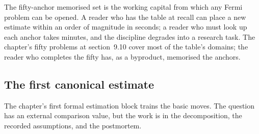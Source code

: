 The fifty-anchor memorised set is the working capital from which
any Fermi problem can be opened. A reader who has the table at
recall can place a new estimate within an order of magnitude in
seconds; a reader who must look up each anchor takes minutes, and
the discipline degrades into a research task. The chapter's fifty
problems at section~9.10 cover most of the table's domains; the
reader who completes the fifty has, as a byproduct, memorised the
anchors.

\subsection{The first canonical estimate}

The chapter's first formal estimation block trains the basic moves. The
question has an external comparison value, but the work is in the
decomposition, the recorded assumptions, and the postmortem.

